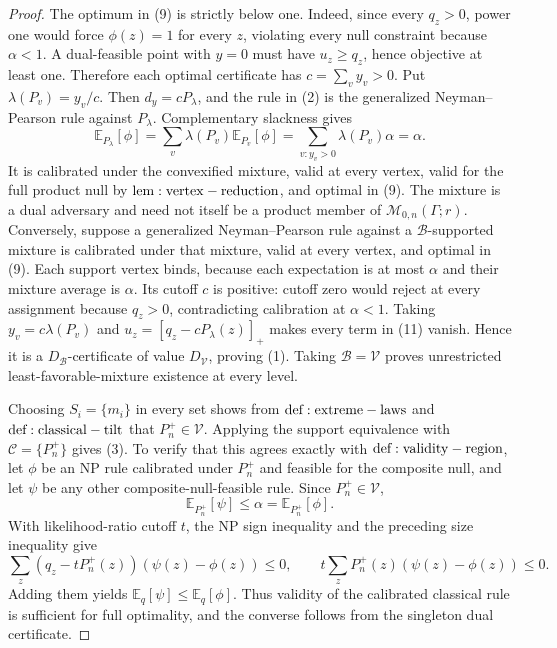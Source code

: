 \documentclass{article}
\begin{document}
\begin{proof}
The optimum in (9) is strictly below one. Indeed, since every \(q_z>0\), power one would force \(\phi(z)=1\) for every \(z\), violating every null constraint because \(\alpha<1\). A dual-feasible point with \(y=0\) must have \(u_z\geq q_z\), hence objective at least one. Therefore each optimal certificate has \(c=\sum_vy_v>0\). Put \(\lambda(P_v)=y_v/c\). Then \(d_y=cP_\lambda\), and the rule in (2) is the generalized Neyman--Pearson rule against \(P_\lambda\). Complementary slackness gives
\[
 \mathbb E_{P_\lambda}[\phi]=\sum_v\lambda(P_v)\mathbb E_{P_v}[\phi]=\sum_{v:y_v>0}\lambda(P_v)\alpha=\alpha.\tag{12}
\]
It is calibrated under the convexified mixture, valid at every vertex, valid for the full product null by \({\rm lem:vertex-reduction}\), and optimal in (9). The mixture is a dual adversary and need not itself be a product member of \(\mathcal M_{0,n}(\Gamma;r)\). Conversely, suppose a generalized Neyman--Pearson rule against a \(\mathcal B\)-supported mixture is calibrated under that mixture, valid at every vertex, and optimal in (9). Each support vertex binds, because each expectation is at most \(\alpha\) and their mixture average is \(\alpha\). Its cutoff \(c\) is positive: cutoff zero would reject at every assignment because \(q_z>0\), contradicting calibration at \(\alpha<1\). Taking \(y_v=c\lambda(P_v)\) and \(u_z=[q_z-cP_\lambda(z)]_+\) makes every term in (11) vanish. Hence it is a \(D_{\mathcal B}\)-certificate of value \(D_{\mathcal V}\), proving (1). Taking \(\mathcal B=\mathcal V\) proves unrestricted least-favorable-mixture existence at every level.

Choosing \(S_i=\{m_i\}\) in every set shows from \({\rm def:extreme-laws}\) and \({\rm def:classical-tilt}\) that \(P_n^+\in\mathcal V\). Applying the support equivalence with \(\mathcal C=\{P_n^+\}\) gives (3). To verify that this agrees exactly with \({\rm def:validity-region}\), let \(\phi\) be an NP rule calibrated under \(P_n^+\) and feasible for the composite null, and let \(\psi\) be any other composite-null-feasible rule. Since \(P_n^+\in\mathcal V\),
\[
 \mathbb E_{P_n^+}[\psi]\leq\alpha=\mathbb E_{P_n^+}[\phi].
\]
With likelihood-ratio cutoff \(t\), the NP sign inequality and the preceding size inequality give
\[
 \sum_z(q_z-tP_n^+(z))(\psi(z)-\phi(z))\leq0,\qquad t\sum_zP_n^+(z)(\psi(z)-\phi(z))\leq0.
\]
Adding them yields \(\mathbb E_q[\psi]\leq\mathbb E_q[\phi]\). Thus validity of the calibrated classical rule is sufficient for full optimality, and the converse follows from the singleton dual certificate.


\end{proof}
\end{document}
